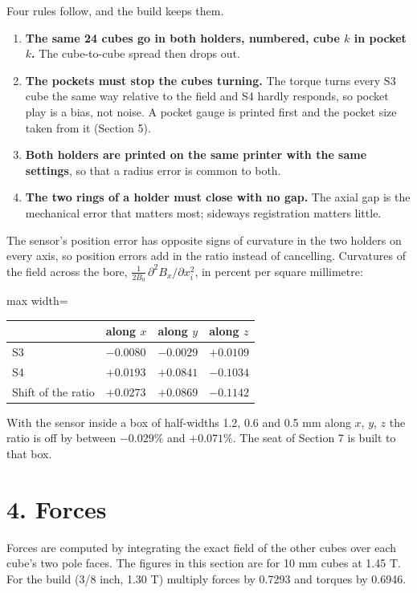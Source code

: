 \documentclass[11pt,a4paper]{article}
\begin{document}
Four rules follow, and the build keeps them.

\begin{enumerate}
\item{} {\bfseries\boldmath The same 24 cubes go in both holders, numbered, cube $k$ in pocket $k$.} The cube-to-cube spread then drops out.
\item{} {\bfseries\boldmath The pockets must stop the cubes turning.} The torque turns every S3 cube the same way relative to the field and S4 hardly responds, so pocket play is a bias, not noise. A pocket gauge is printed first and the pocket size taken from it (Section 5).
\item{} {\bfseries\boldmath Both holders are printed on the same printer with the same settings}, so that a radius error is common to both.
\item{} {\bfseries\boldmath The two rings of a holder must close with no gap.} The axial gap is the mechanical error that matters most; sideways registration matters little.
\end{enumerate}

The sensor's position error has opposite signs of curvature in the two holders on every axis, so position errors add in the ratio instead of cancelling. Curvatures of the field across the bore, $\tfrac{1}{2B_0}\,\partial^2 B_x/\partial x_i^2$, in percent per square millimetre:

\begin{center}
\begin{adjustbox}{max width=\linewidth}
\begin{tabular}{llll}
\hline
{}{\bfseries\boldmath } & {\bfseries\boldmath along $x$} & {\bfseries\boldmath along $y$} & {\bfseries\boldmath along $z$} \\
\hline
{}S3 & $-0.0080$ & $-0.0029$ & $+0.0109$ \\
{}S4 & $+0.0193$ & $+0.0841$ & $-0.1034$ \\
{}Shift of the ratio & $+0.0273$ & $+0.0869$ & $-0.1142$ \\
\hline
\end{tabular}
\end{adjustbox}
\end{center}

With the sensor inside a box of half-widths 1.2, 0.6 and 0.5 mm along $x$, $y$, $z$ the ratio is off by between $-0.029\%$ and $+0.071\%$. The seat of Section 7 is built to that box.


\section*{4. Forces}
Forces are computed by integrating the exact field of the other cubes over each cube's two pole faces. The figures in this section are for 10 mm cubes at 1.45 T. For the build (3/8 inch, 1.30 T) multiply forces by 0.7293 and torques by 0.6946.
\end{document}
